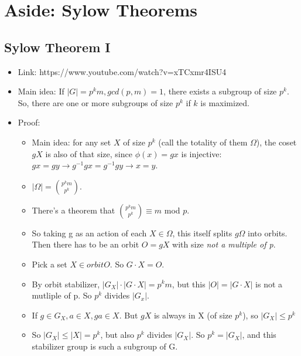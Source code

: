 \documentclass[11pt, oneside]{article}   	%
\begin{document}
\section{Aside: Sylow Theorems}

\subsection{Sylow Theorem I}
\begin{itemize}
\item Link: https://www.youtube.com/watch?v=xTCxmr4ISU4
\item Main idea: If $|G| = p^km, gcd(p,m) =1$, there exists a subgroup of size $p^k$.  So, there are one or more subgroups of size $p^k$ if $k$ is maximized.
\item Proof: 
\begin{itemize}
\item Main idea: for any set $X$ of size $p^k$ (call the totality of them $\Omega$), the coset $gX$ is also of that size, since $\phi(x) = gx$ is injective: $gx = gy \rightarrow g^{-1}gx = g^{-1}gy \rightarrow x = y$. 
\item $|\Omega| = {p^km \choose p^k}$.  
\item There's a theorem that ${p^km \choose p^k} \equiv m $ mod $p$.  
\item So taking g as an action of each $X \in \Omega$, this itself splits $g\Omega$ into orbits.  Then there has to be an orbit  $O = gX$ with size \emph{not a multiple of p}.
\item Pick a set $X \in orbit O$.  So $G \cdot X = O$.  
\item By orbit stabilizer, $|G_X| \cdot |G \cdot X| = p^km$, but this $|O| = |G \cdot X|$ is not a mutliple of p.  So $p^k $ divides $ |G_x|$.
\item If $g \in G_X, a \in X, ga \in X$.  But $gX$ is always in X (of size $p^k$), so $|G_X| \leq p^k$
\item So $|G_X| \leq |X| = p^k$, but also $p^k$ divides $|G_X|$.  So $p^k = |G_X|$, and this stabilizer group is such a subgroup of G.
\end{itemize}
\end{itemize}
\end{document}
